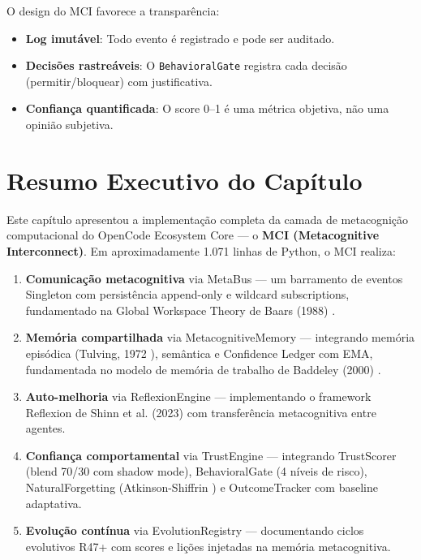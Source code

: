 O design do MCI favorece a transparência:

\begin{itemize}
    \item \textbf{Log imutável}: Todo evento é registrado e pode ser auditado.
    \item \textbf{Decisões rastreáveis}: O \texttt{BehavioralGate} registra cada decisão (permitir/bloquear) com justificativa.
    \item \textbf{Confiança quantificada}: O score 0--1 é uma métrica objetiva, não uma opinião subjetiva.
\end{itemize}

\section{Resumo Executivo do Capítulo}
\label{sec:executive-summary}

Este capítulo apresentou a implementação completa da camada de metacognição computacional do OpenCode Ecosystem Core — o \textbf{MCI (Metacognitive Interconnect)}. Em aproximadamente 1.071 linhas de Python, o MCI realiza:

\begin{enumerate}
    \item \textbf{Comunicação metacognitiva} via MetaBus — um barramento de eventos Singleton com persistência append-only e wildcard subscriptions, fundamentado na Global Workspace Theory de Baars (1988) \cite{Baars1988_GWT}.
    
    \item \textbf{Memória compartilhada} via MetacognitiveMemory — integrando memória episódica (Tulving, 1972 \cite{Tulving1972_Episodic}), semântica e Confidence Ledger com EMA, fundamentada no modelo de memória de trabalho de Baddeley (2000) \cite{Baddeley2000_EpisodicBuffer}.
    
    \item \textbf{Auto-melhoria} via ReflexionEngine — implementando o framework Reflexion de Shinn et al. (2023) \cite{Shinn2023_Reflexion} com transferência metacognitiva entre agentes.
    
    \item \textbf{Confiança comportamental} via TrustEngine — integrando TrustScorer (blend 70/30 com shadow mode), BehavioralGate (4 níveis de risco), NaturalForgetting (Atkinson-Shiffrin \cite{Atkinson1968_Memory}) e OutcomeTracker com baseline adaptativa.
    
    \item \textbf{Evolução contínua} via EvolutionRegistry — documentando ciclos evolutivos R47+ com scores e lições injetadas na memória metacognitiva.
\end{enumerate}

